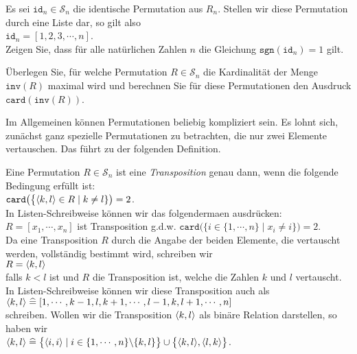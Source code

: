 \exercise
Es sei $\mathtt{id}_n \in \mathcal{S}_n$ die identische Permutation aus $R_n$.  Stellen wir diese Permutation
durch eine Liste dar, so gilt also
\\[0.2cm]
\hspace*{1.3cm}
$\mathtt{id}_n = [1,2,3, \cdots, n]$.
\\[0.2cm]
Zeigen Sie, dass f\"ur alle nat\"urlichen Zahlen $n$ die Gleichung
 $\mathtt{sgn}(\mathtt{id}_n) = 1$
 gilt.  \eoxs


\exercise
\"Uberlegen Sie, f\"ur welche Permutation $R \in \mathcal{S}_n$ die Kardinalit\"at der Menge
$\mathtt{inv}(R)$ maximal wird und berechnen Sie f\"ur diese Permutationen den Ausdruck
$\mathtt{card}(\mathtt{inv}(R))$. \eoxs
\pagebreak

Im Allgemeinen k\"onnen Permutationen beliebig kompliziert sein.  Es lohnt sich, zun\"achst ganz
spezielle Permutationen zu betrachten, die nur zwei Elemente vertauschen.  Das f\"uhrt zu der
folgenden Definition.

\begin{Definition}[Transposition]
  Eine Permutation $R \in \mathcal{S}_n$ ist eine \emph{Transposition} genau dann, wenn
  die folgende Bedingung erf\"ullt ist:
  \\[0.2cm]
  \hspace*{1.3cm}
  $\mathtt{card}\bigl(\bigl\{ \pair(k,l) \in R \mid k \not= l \}\bigr) = 2$.
  \\[0.2cm]
  In Listen-Schreibweise k\"onnen wir das folgenderma\3en ausdr\"ucken:
  \\[0.2cm]
  \hspace*{1.3cm}
  $R = [x_1, \cdots, x_n]$  ist Transposition \quad g.d.w. \quad $\mathtt{card}\bigl(\bigl\{i \in \{1,\cdots,n\} \mid x_i \not= i \bigr\}\bigr) = 2$.
  \\[0.2cm]
  Da eine Transposition $R$ durch die Angabe der beiden Elemente, die vertauscht werden, vollst\"andig
  bestimmt wird, schreiben wir
  \\[0.2cm]
  \hspace*{1.3cm}
  $R = \pair(k, l)$ 
  \\[0.2cm]
  falls $k < l$ ist und $R$ die Transposition ist, welche die Zahlen $k$ und $l$ vertauscht.  In Listen-Schreibweise
  k\"onnen wir diese Transposition auch als
  \\[0.2cm]
  \hspace*{1.3cm}
  $\pair(k, l) \;\widehat{=}\; [1, \cdots, k-1, l, k+1, \cdots, l-1, k, l+1, \cdots, n]$
  \\[0.2cm]
  schreiben.  Wollen wir die Transposition $\pair(k, l)$ als bin\"are Relation darstellen, so haben wir
  \\[0.2cm]
  \hspace*{1.3cm}
  $\pair(k,l) \;\widehat{=}\; \bigl\{ \pair(i,i) \mid i \in \{ 1, \cdots, n \} \backslash \{k,l\} \bigr\} \cup \bigl\{ \pair(k,l), \pair(l,k) \bigr\}$.
  \eoxs
\end{Definition}

